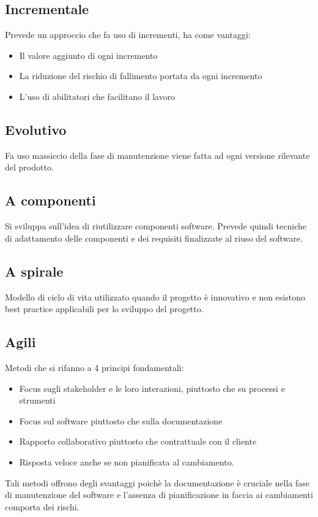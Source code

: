 \documentclass[11pt]{article}
\begin{document}
		\subsection{Incrementale}
			Prevede un approccio che fa uso di incrementi, ha come vantaggi:
			\begin{itemize}  
			\item Il valore aggiunto di ogni incremento 
			\item La riduzione del rischio di fallimento portata da ogni incremento
			\item L'uso di abilitatori che facilitano il lavoro 
			\end{itemize}			
			
		\subsection{Evolutivo}
			Fa uso massiccio della fase di manutenzione viene fatta ad ogni versione rilevante del prodotto.
		
		\subsection{A componenti}
			Si sviluppa sull'idea di riutilizzare componenti software. Prevede quindi tecniche di adattamento delle componenti e dei requisiti finalizzate al riuso del software.
		
		\subsection{A spirale}	
				Modello di ciclo di vita utilizzato quando il progetto è innovativo e non esistono best practice applicabili per lo sviluppo del progetto.
		
		\subsection{Agili}
		Metodi che si rifanno a 4 principi fondamentali:
			\begin{itemize}  
			\item Focus sugli stakeholder e le loro interazioni, piuttosto che su processi e strumenti
			\item Focus sul software piuttosto che sulla documentazione
			\item Rapporto collaborativo piuttosto che contrattuale con il cliente
			\item Risposta veloce anche se non pianificata al cambiamento. 
			\end{itemize}				
		Tali metodi offrono degli svantaggi poichè la documentazione è cruciale nella fase di manutenzione del software e l'assenza di pianificazione in faccia ai cambiamenti comporta dei rischi.
		
\end{document}
